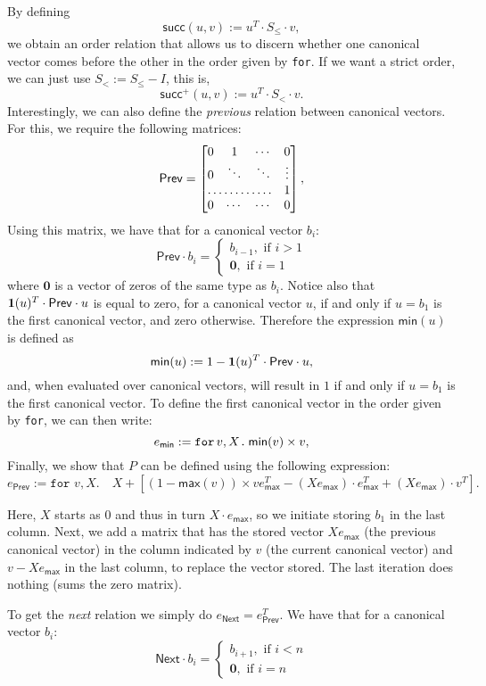 By defining $$\mathsf{succ}(u,v) := u^T\cdot S_{\leq} \cdot v,$$
we obtain an order relation that allows us to discern whether one canonical vector comes before the other in the order given by \texttt{for}. If we want a strict order, we can just use $S_< := S_{\leq} - I$, this is, $$\mathsf{succ}^+(u,v) := u^T\cdot S_{<} \cdot v.$$
Interestingly, we can also define the \textit{previous} relation between canonical vectors. For this, we require the following matrices:
\[
\mathsf{Prev} = \begin{bmatrix}
    0 & 1 & \cdots &  0 \\
    0 & \ddots & \ddots & \vdots \\
    \hdotsfor{3} & 1 \\
    0 & \cdots & \cdots & 0
\end{bmatrix},
\]
Using this matrix, we have that for a canonical vector $b_i$:
\[
\mathsf{Prev}\cdot b_i=\begin{cases}
               b_{i-1}, \text{ if } i > 1 \\
              \mathbf{0}, \text{ if } i = 1
            \end{cases}
\]
where $\mathbf{0}$ is a vector of zeros of the same type as $b_i$. Notice also that $\mathbf{1}(u)^T\cdot \mathsf{Prev} \cdot u$ is equal to zero, for a canonical vector $u$, if and only if $u = b_1$ is the first canonical vector, and zero otherwise.
Therefore the expression $\mathsf{min}(u)$ is defined as $$\mathsf{min}(u) := 1 - \mathbf{1}(u)^T\cdot \mathsf{Prev} \cdot u,$$ and, when evaluated over canonical vectors, will result in $1$ if and only if $u=b_1$ is the first canonical vector.
To define the first canonical vector in the order given by \texttt{for}, we can then write:
$$e_{\mathsf{min}} := \texttt{for}\, v,X \texttt{.}\, \mathsf{min}(v)\times v,$$
Finally, we show that $P$ can be defined using the following \langfor expression:
$$e_{\mathsf{Prev}}:= \texttt{for }v,X.\quad X + \left[ (1 - \mathsf{max}(v))\times ve_{\mathsf{max}}^T - (Xe_{\mathsf{max}})\cdot e_{\mathsf{max}}^T + (Xe_{\mathsf{max}})\cdot v^T\right].$$

Here, $X$ starts as 0 and thus in turn $X\cdot e_{\mathsf{max}}$, so we initiate storing $b_1$ in the last column. Next, we add a matrix that has the stored vector $Xe_{\mathsf{max}}$ (the previous canonical vector) in the column indicated by $v$ (the current canonical vector) and $v-Xe_{\mathsf{max}}$ in the last column, to replace the vector stored.
The last iteration does nothing (sums the zero matrix).

To get the \textit{next} relation we simply do $e_{\mathsf{Next}} = e_{\mathsf{Prev}}^T$. We have that for a canonical vector $b_i$:
\[
\mathsf{Next}\cdot b_i=\begin{cases}
               b_{i+1}, \text{ if } i < n \\
              \mathbf{0}, \text{ if } i = n
            \end{cases}
\]


